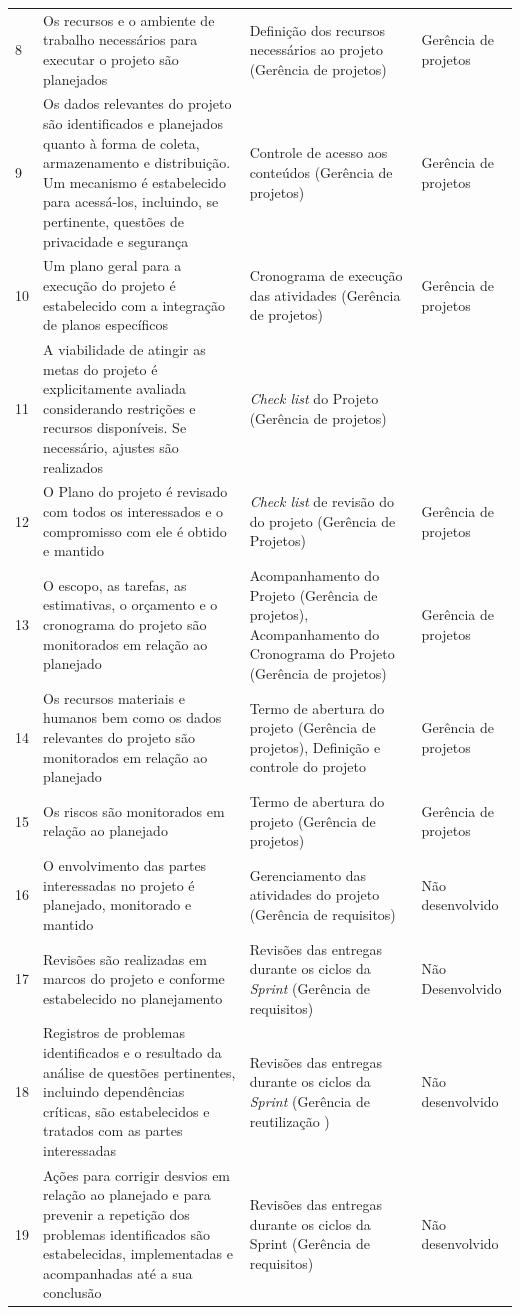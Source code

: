 \documentclass{acm_proc_article-sp}
\begin{document}
\begin{appendices}
\begin{table}[h]
\begin{tabular}{|p{10mm}|p{60mm}|p{60mm}|p{25mm}|}
8 & Os recursos e o ambiente de trabalho necessários para executar o projeto são planejados & Definição dos recursos necessários ao projeto (Gerência de projetos) & Gerência de projetos\\
9 & Os dados relevantes do projeto são identificados e planejados quanto à forma de coleta, armazenamento e distribuição. Um mecanismo é estabelecido para acessá-los, incluindo, se pertinente, questões de privacidade e segurança & Controle de acesso aos conteúdos (Gerência de projetos) & Gerência de projetos\\
10 & Um plano geral para a execução do projeto é estabelecido com a integração de planos específicos & Cronograma de execução das atividades (Gerência de projetos) & Gerência de projetos\\
11 & A viabilidade de atingir as metas do projeto é explicitamente avaliada considerando restrições e recursos disponíveis. Se necessário, ajustes são realizados & \textit{Check list} do Projeto (Gerência de projetos) & \\
12 & O Plano do projeto é revisado com todos os interessados e o compromisso com ele é obtido e mantido &  \textit{Check list} de revisão do do projeto (Gerência de Projetos)& Gerência de projetos\\
13 & O escopo, as tarefas, as estimativas, o orçamento e o cronograma do projeto são monitorados em relação ao planejado & 
Acompanhamento do Projeto (Gerência de projetos), Acompanhamento do Cronograma do Projeto (Gerência de projetos) & Gerência de projetos\\
14 & Os recursos materiais e humanos bem como os dados relevantes do projeto são monitorados em relação ao planejado & 
Termo de abertura do projeto (Gerência de projetos), Definição e controle do projeto & Gerência de projetos \\
15 & Os riscos são monitorados em relação ao planejado & Termo de abertura do projeto (Gerência de projetos) &  Gerência de projetos\\
16 & O envolvimento das partes interessadas no projeto é planejado, monitorado e mantido & Gerenciamento das atividades do projeto (Gerência de requisitos)  & Não desenvolvido \\
17 & Revisões são realizadas em marcos do projeto e conforme estabelecido no planejamento & Revisões das entregas durante os ciclos da \textit{Sprint} (Gerência de requisitos) & Não Desenvolvido \\
18 & Registros de problemas identificados e o resultado da análise de questões pertinentes, incluindo dependências críticas, são
estabelecidos e tratados com as partes interessadas & Revisões das entregas durante os ciclos da \textit{Sprint} (Gerência de reutilização ) & Não desenvolvido \\
19 & Ações para corrigir desvios em relação ao planejado e para prevenir a repetição dos problemas identificados são estabelecidas, implementadas e acompanhadas até a sua conclusão & Revisões das entregas durante os ciclos da Sprint (Gerência de requisitos) & Não desenvolvido \\


\end{tabular}
\end{table}
\end{appendices}
\end{document}
